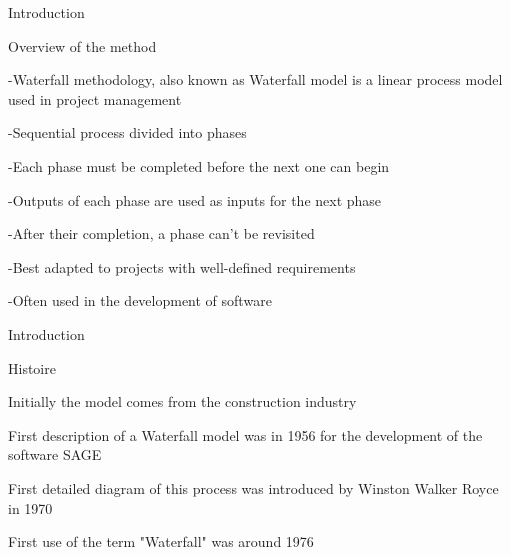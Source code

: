 \begin{frame}{Introduction}

   \begin{block}{Overview of the method}

   \item -Waterfall methodology, also known as Waterfall model is a linear process model used in project management

   \item -Sequential process divided into phases
   
   \item -Each phase must be completed before the next one can begin

   \item -Outputs of each phase are used as inputs for the next phase

   \item -After their completion, a phase can't be revisited

   \item -Best adapted to projects with well-defined requirements

   \item -Often used in the development of software

   \end{block}

\end{frame}

\begin{frame}{Introduction}

   \begin{block}{Histoire}

   \item Initially the model comes from the construction industry

   \item First description of a Waterfall model was in 1956 for the development of the software SAGE

   \item First detailed diagram of this process was introduced by Winston Walker Royce in 1970

   \item First use of the term "Waterfall" was around 1976

   \end{block}

\end{frame}